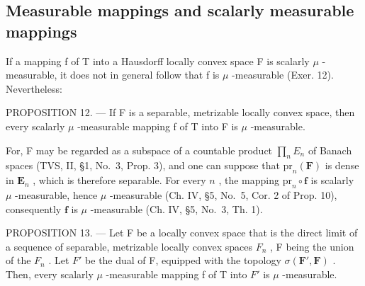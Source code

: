 \subsection{Measurable mappings and scalarly measurable mappings}

If a mapping f of T into a Hausdorff locally convex space F is scalarly \(\mu\) -measurable, it does not in general follow that f is \(\mu\) -measurable (Exer. 12). Nevertheless:

PROPOSITION 12. --- If F is a separable, metrizable locally convex space, then every scalarly \(\mu\) -measurable mapping f of T into F is \(\mu\) -measurable.

For, F may be regarded as a subspace of a countable product \(\prod_{n}E_{n}\) of Banach spaces (TVS, II, §1, No.~3, Prop. 3), and one can suppose that \(\mathrm{pr}_n(\mathbf{F})\) is dense in \(\mathbf{E}_n\) , which is therefore separable. For every \(n\) , the mapping \(\mathrm{pr}_n \circ \mathbf{f}\) is scalarly \(\mu\) -measurable, hence \(\mu\) -measurable (Ch. IV, §5, No.~5, Cor. 2 of Prop. 10), consequently \(\mathbf{f}\) is \(\mu\) -measurable (Ch. IV, §5, No.~3, Th. 1).

PROPOSITION 13. --- Let F be a locally convex space that is the direct limit of a sequence of separable, metrizable locally convex spaces \(F_{n}\) , F being the union of the \(F_{n}\) . Let \(F'\) be the dual of F, equipped with the topology \(\sigma(\mathbf{F}',\mathbf{F})\) . Then, every scalarly \(\mu\) -measurable mapping f of T into \(F'\) is \(\mu\) -measurable.

